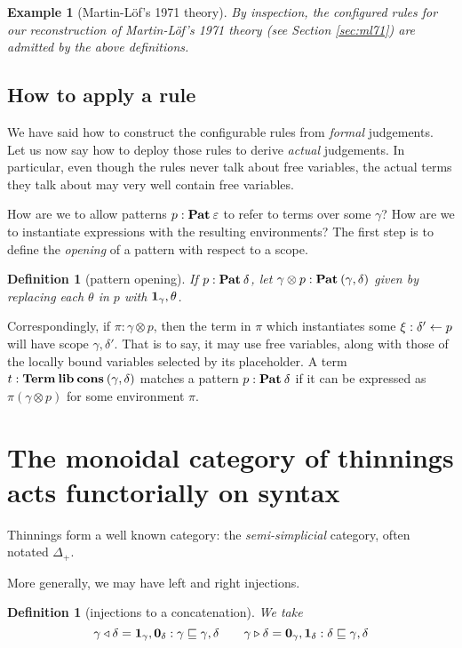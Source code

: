 \documentclass{jfp1}
\newtheorem{definition}[theorem]{Definition}
\newtheorem{example}[theorem]{Example}
\newcommand{\emp}{\varepsilon}
\begin{document}
\begin{example}[Martin-L\"of's 1971 theory]
By inspection, the configured rules for our reconstruction of
Martin-L\"of's 1971 theory (see Section \ref{sec:ml71}) are admitted by the above definitions.
\end{example}


\subsection{How to apply a rule}

We have said how to construct the configurable rules from \emph{formal}
judgements. Let us now say how to deploy those rules to derive
\emph{actual} judgements. In particular, even though the rules never
talk about free variables, the actual terms they talk about may very
well contain free variables.

How are we to allow patterns $p : \Pat\emp$ to refer to terms over
some $\gamma$? How are we to instantiate expressions with the
resulting environments? The first step is to define the \emph{opening}
of a pattern with respect to a scope.

\begin{definition}[pattern opening]
  If $p : \textbf{Pat}\:\delta$, let $\gamma\otimes p : \textbf{Pat}\:(\gamma,\delta)$
  given by replacing each $\theta$ in $p$ with $\mathbf{1}_\gamma,\theta$.
\end{definition}

Correspondingly, if $\pi:\gamma\otimes p$, then the term in $\pi$
which instantiates some $\xi : \delta'\leftarrow p$ will have scope
$\gamma,\delta'$. That is to say, it may use free variables, along
with those of the locally bound variables selected by its placeholder.
A term $t:\mathbf{Term}\:\textbf{lib}\:\textbf{cons}\:(\gamma,\delta)$ matches a pattern
$p:\textbf{Pat}\:\delta$ if it can be expressed as $\pi(\gamma\otimes p)$ for
some environment $\pi$.



\section{The monoidal category of thinnings acts functorially on syntax\label{sec:thincat}}

Thinnings form a well known category: the \emph{semi-simplicial} category, often notated $\Delta_+$.


More generally, we may have left and right injections.
\newcommand{\thinl}[2]{#1 \triangleleft #2}
\newcommand{\thinr}[2]{#1 \triangleright #2}
\begin{definition}[injections to a concatenation]
  We take
  \[
    \thinl\gamma\delta = \ith_\gamma,\eth_\delta :
    \gamma\thin\gamma,\delta \qquad
    \thinr\gamma\delta = \eth_\gamma,\ith_\delta :
    \delta\thin\gamma,\delta
    \]
\end{definition}
\end{document}
